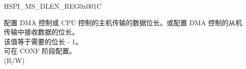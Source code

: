 \begin{register}{H}{SPI\_MS\_DLEN\_REG}{0x001C}\label{regdesc:SPIMSDLENREG}
%
%
\regnewline%
\begin{regdesc}\begin{reglist}
\label{fielddesc:SPIMSDATABITLEN}\item [SPI\_MS\_DATA\_BITLEN] 配置 DMA 控制或 CPU 控制的主机传输的数据位长。或配置 DMA 控制的从机传输中接收数据的位长。\\
该值等于需要的位长 - 1。 \\
可在 CONF 阶段配置。\\
(R/W)
\end{reglist}\end{regdesc}
\end{register}


